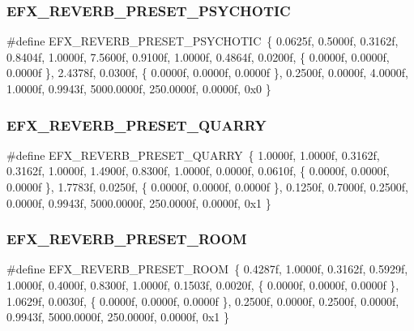 \subsubsection{\texorpdfstring{E\+F\+X\+\_\+\+R\+E\+V\+E\+R\+B\+\_\+\+P\+R\+E\+S\+E\+T\+\_\+\+P\+S\+Y\+C\+H\+O\+T\+IC}{EFX\_REVERB\_PRESET\_PSYCHOTIC}}
{\footnotesize\ttfamily \#define E\+F\+X\+\_\+\+R\+E\+V\+E\+R\+B\+\_\+\+P\+R\+E\+S\+E\+T\+\_\+\+P\+S\+Y\+C\+H\+O\+T\+IC~\{ 0.\+0625f, 0.\+5000f, 0.\+3162f, 0.\+8404f, 1.\+0000f, 7.\+5600f, 0.\+9100f, 1.\+0000f, 0.\+4864f, 0.\+0200f, \{ 0.\+0000f, 0.\+0000f, 0.\+0000f \}, 2.\+4378f, 0.\+0300f, \{ 0.\+0000f, 0.\+0000f, 0.\+0000f \}, 0.\+2500f, 0.\+0000f, 4.\+0000f, 1.\+0000f, 0.\+9943f, 5000.\+0000f, 250.\+0000f, 0.\+0000f, 0x0 \}}

\mbox{\label{efx-presets_8h_a75ff37a6a3dba17f608feecd3e3b7a3f}} 
\subsubsection{\texorpdfstring{E\+F\+X\+\_\+\+R\+E\+V\+E\+R\+B\+\_\+\+P\+R\+E\+S\+E\+T\+\_\+\+Q\+U\+A\+R\+RY}{EFX\_REVERB\_PRESET\_QUARRY}}
{\footnotesize\ttfamily \#define E\+F\+X\+\_\+\+R\+E\+V\+E\+R\+B\+\_\+\+P\+R\+E\+S\+E\+T\+\_\+\+Q\+U\+A\+R\+RY~\{ 1.\+0000f, 1.\+0000f, 0.\+3162f, 0.\+3162f, 1.\+0000f, 1.\+4900f, 0.\+8300f, 1.\+0000f, 0.\+0000f, 0.\+0610f, \{ 0.\+0000f, 0.\+0000f, 0.\+0000f \}, 1.\+7783f, 0.\+0250f, \{ 0.\+0000f, 0.\+0000f, 0.\+0000f \}, 0.\+1250f, 0.\+7000f, 0.\+2500f, 0.\+0000f, 0.\+9943f, 5000.\+0000f, 250.\+0000f, 0.\+0000f, 0x1 \}}

\mbox{\label{efx-presets_8h_ade1399e441c36d69b5ae54171f3fc4c5}} 
\subsubsection{\texorpdfstring{E\+F\+X\+\_\+\+R\+E\+V\+E\+R\+B\+\_\+\+P\+R\+E\+S\+E\+T\+\_\+\+R\+O\+OM}{EFX\_REVERB\_PRESET\_ROOM}}
{\footnotesize\ttfamily \#define E\+F\+X\+\_\+\+R\+E\+V\+E\+R\+B\+\_\+\+P\+R\+E\+S\+E\+T\+\_\+\+R\+O\+OM~\{ 0.\+4287f, 1.\+0000f, 0.\+3162f, 0.\+5929f, 1.\+0000f, 0.\+4000f, 0.\+8300f, 1.\+0000f, 0.\+1503f, 0.\+0020f, \{ 0.\+0000f, 0.\+0000f, 0.\+0000f \}, 1.\+0629f, 0.\+0030f, \{ 0.\+0000f, 0.\+0000f, 0.\+0000f \}, 0.\+2500f, 0.\+0000f, 0.\+2500f, 0.\+0000f, 0.\+9943f, 5000.\+0000f, 250.\+0000f, 0.\+0000f, 0x1 \}}

